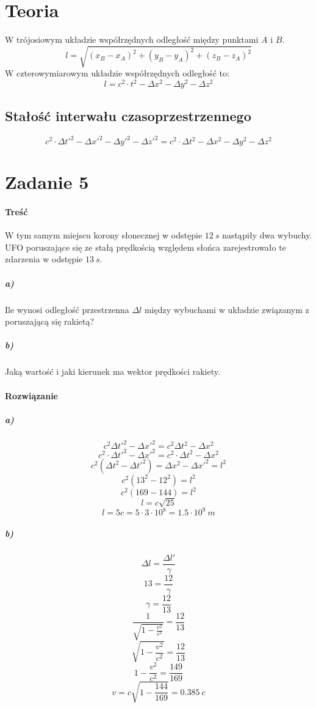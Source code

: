 \documentclass [a4paper, 11pt, oneside]{book}
\begin{document}
	\section{Teoria} %
	\label{sec:teoria}
		W trójosiowym układzie współrzędnych odległość między punktami $A$ i $B$.
		\[
			l = \sqrt{(x_B-x_A)^2 + (y_B-y_A)^2 + (z_B-z_A)^2}
		\]
		W czterowymiarowym układzie współrzędnych odległość to:
		\[
			l = c^2\cdot t^2 - \Delta x^2 - \Delta y^2 - \Delta z^2
		\]
		\subsection{Stałość interwału czasoprzestrzennego} %
		\label{sub:sta_o_interwa_u_czasoprzestrzennego}
			\[
				c^2\cdot\Delta t'^2 - \Delta x'^2 - \Delta y'^2 - \Delta z'^2 = c^2\cdot \Delta t^2 - \Delta x^2 - \Delta y^2 - \Delta z^2
			\]

		\section{Zadanie 5} %
	\label{sec:zadanie_5}
		\paragraph{Treść} W tym samym miejscu korony słonecznej w odstępie $12~s$ nastąpiły dwa wybuchy. UFO poruszające się ze stałą prędkością względem słońca zarejestrowało te zdarzenia w odstępie $13~s$.
			\subparagraph{a)}Ile wynosi odległość przestrzenna $\Delta l$ między wybuchami w układzie związanym z poruszającą się rakietą?
			\subparagraph{b)}Jaką wartość i jaki kierunek ma wektor prędkości rakiety.
		\paragraph{Rozwiązanie}
		\subparagraph{a)}
		\[
			c^2\Delta t'^2 - \Delta x'^2 = c^2\Delta t^2 - \Delta x^2
		\]
		\[
			c^2\cdot\Delta t'^2 -\Delta x'^2 = c^2\cdot \Delta t^2 - \Delta x^2
		\]
		\[
			c^2(\Delta t^2 - \Delta t'^2) = \Delta x^2 - \Delta x'^2 = l^2
		\]
		\[
			c^2(13^2-12^2) = l^2
		\]
		\[
			c^2(169-144) = l^2
		\]
		\[
			l = c\sqrt{25}
		\]
		\[
			l = 5c = 5\cdot3\cdot10^{8} = 1.5\cdot10^9~m
		\]
		\subparagraph{b)}
		\[
			\Delta l = \frac{\Delta l'}{\gamma}
		\]
		\[
			13 = \frac{12}{\gamma}
		\]
		\[
			\gamma = \frac{12}{13}
		\]
		\[
			\frac{1}{\sqrt{1-\frac{v^2}{c^2}}} = \frac{12}{13}
		\]
		\[
			\sqrt{1-\frac{v^2}{c^2}} = \frac{12}{13}
		\]
		\[
			1-\frac{v^2}{c^2} = \frac{149}{169}
		\]
		\[
			v = c\sqrt{1-\frac{144}{169}} = 0.385~c
		\]
\end{document}
